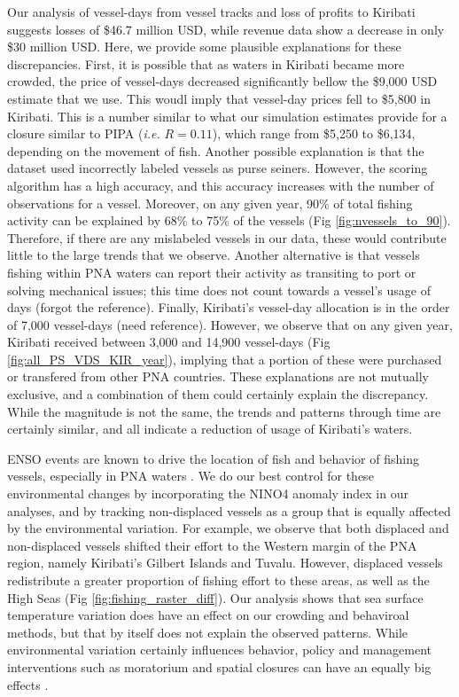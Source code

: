 \documentclass[9p,twocolumn,twoside,lineno]{pnas-new}
\begin{document}
Our analysis of vessel-days from vessel tracks and loss of profits to Kiribati suggests losses of \$46.7 million USD, while revenue data show a decrease in only \$30 million USD. Here, we provide some plausible explanations for these discrepancies. First, it is possible that as waters in Kiribati became more crowded, the price of vessel-days decreased significantly bellow the \$9,000 USD estimate that we use. This woudl imply that vessel-day prices fell to \$5,800 in Kiribati. This is a number similar to what our simulation estimates provide for a closure similar to PIPA (\emph{i.e.} $R = 0.11$), which range from \$5,250 to \$6,134, depending on the movement of fish. Another possible explanation is that the dataset used incorrectly labeled vessels as purse seiners. However, the scoring algorithm has a high accuracy, and this accuracy increases with the number of observations for a vessel. Moreover, on any given year, 90\% of total fishing activity can be explained by 68\% to 75\% of the vessels (Fig \ref{fig:nvessels_to_90}). Therefore, if there are any mislabeled vessels in our data, these would contribute little to the large trends that we observe. Another alternative is that vessels fishing within PNA waters can report their activity as transiting to port or solving mechanical issues; this time does not count towards a vessel's usage of days (forgot the reference). Finally, Kiribati's vessel-day allocation is in the order of 7,000 vessel-days (need reference). However, we observe that on any given year, Kiribati received between 3,000 and 14,900 vessel-days (Fig \ref{fig:all_PS_VDS_KIR_year}), implying that a portion of these were purchased or transfered from other PNA countries. These explanations are not mutually exclusive, and a combination of them could certainly explain the discrepancy. While the magnitude is not the same, the trends and patterns through time are certainly similar, and all indicate a reduction of usage of Kiribati's waters.

ENSO events are known to drive the location of fish and behavior of fishing vessels, especially in PNA waters \cite{lehodey_1997,kroodsma_2018,aqorau_2018}. We do our best control for these environmental changes by incorporating the NINO4 anomaly index in our analyses, and by tracking non-displaced vessels as a group that is equally affected by the environmental variation. For example, we observe that both displaced and non-displaced vessels shifted their effort to the Western margin of the PNA region, namely Kiribati's Gilbert Islands and Tuvalu. However, displaced vessels redistribute a greater proportion of fishing effort to these areas, as well as the High Seas (Fig \ref{fig:fishing_raster_diff}). Our analysis shows that sea surface temperature variation does have an effect on our crowding and behaviroal methods, but that by itself does not explain the observed patterns. While environmental variation certainly influences behavior, policy and management interventions such as moratorium and spatial closures can have an equally big effects \cite{kroodsma_2018}.
\end{document}
